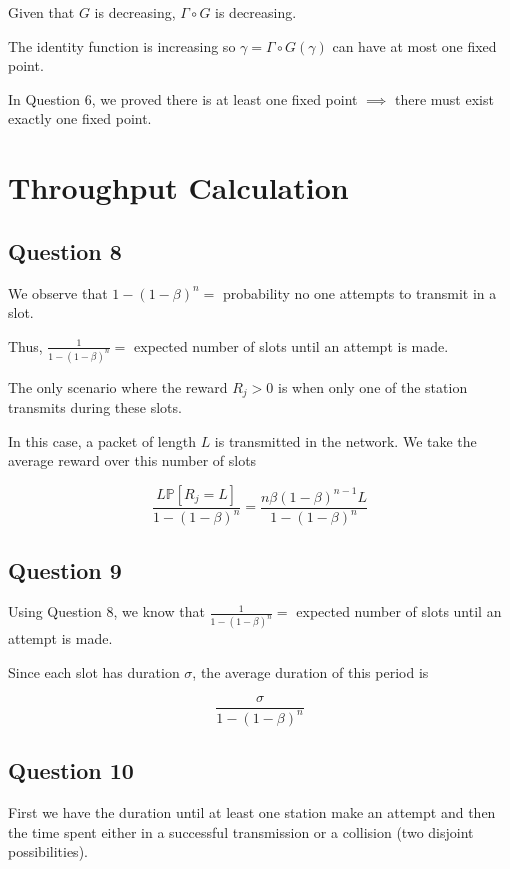 \documentclass[]{article}
\begin{document}
	Given that $G$ is decreasing, $\Gamma \circ G$ is decreasing.
	
	The identity function is increasing so $\gamma  = \Gamma \circ G (\gamma)$ can have at most one fixed point.
	
	In Question 6, we proved there is at least one fixed point $\implies$ there must exist exactly one fixed point.
	
	\section{Throughput Calculation}
	
	\subsection*{Question 8}
	
	We observe that $1 - (1-\beta)^n = $ probability no one attempts to transmit in a slot.
	
	Thus, $\frac{1}{1 - (1-\beta)^n} = $ expected number of slots until an attempt is made.
	
	The only scenario where the reward $R_j > 0$ is when only one of the station transmits during these slots.
	
	In this case, a packet of length $L$ is transmitted in the network. We take the average reward over this number of slots
	
	\begin{equation}
		\frac{L \mathbb{P}[R_j = L]}{1 - (1-\beta)^n} = \frac{n\beta(1-\beta)^{n-1}L}{1 - (1-\beta)^n}
	\end{equation}
	
	\subsection*{Question 9}
	
	Using Question 8, we know that $\frac{1}{1 - (1-\beta)^n} = $ expected number of slots until an attempt is made.
	
	Since each slot has duration $\sigma$, the average duration of this period is
	
	$$\frac{\sigma}{1 - (1-\beta)^n}$$
	
	\subsection*{Question 10}
	
	First we have the duration until at least one station make an attempt and then the time spent either in a successful transmission or a collision (two disjoint possibilities).
	
\end{document}
